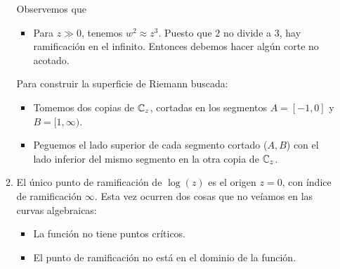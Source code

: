 \begin{solution}
\begin{itemize}
\begin{enumerate}[label=\alph*)]
        Observemos que
        \begin{itemize}
            \item Para $z \gg 0$, tenemos $w^2 \approx z^3$. Puesto que $2$ no divide a $3$, hay ramificación en el infinito. Entonces debemos hacer algún corte no acotado.
        \end{itemize}
        
        Para construir la superficie de Riemann buscada:
        \begin{itemize}
            \item Tomemos dos copias de $\mathbb C_z$, cortadas en los segmentos $A = [-1, 0]$ y $B = [1, \infty)$.
            \item Peguemos el lado superior de cada segmento cortado ($A, B$) con el lado inferior del mismo segmento en la otra copia de $\mathbb C_z$.
        \end{itemize}
        
        \item El único punto de ramificación de $\log(z)$ es el origen $z = 0$, con índice de ramificación $\infty$. Esta vez ocurren dos cosas que no veíamos en las curvas algebraicas:
        \begin{itemize}
            \item La función no tiene puntos críticos.
            \item El punto de ramificación no está en el dominio de la función.
        \end{itemize}
        

\end{enumerate}
\end{itemize}
\end{solution}

